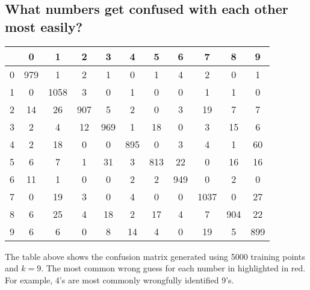 \documentclass{article}
\begin{document}
\subsection{What numbers get confused with each other most easily?}
{\scriptsize
\begin{tabular}{r|cccccccccc}
& 0 & 1 & 2 & 3 & 4 & 5 & 6 & 7 & 8 & 9 \\
\hline\noalign{\smallskip}
0 & 979 & 1 & 2 & 1 & 0 & 1 & \color{red}4 & 2 & 0 & 1 \\
1 & 0 & 1058 & \color{red}3 & 0 & 1 & 0 & 0 & 1 & 1 & 0 \\
2 &  14  & \color{red}26 & 907 & 5 & 2 & 0 & 3 & 19 & 7 & 7 \\
3 & 2 & 4 & 12 & 969 & 1 & \color{red}18 & 0 & 3 & 15 & 6 \\
4 & 2 & 18 & 0 & 0 & 895 & 0 & 3 & 4 & 1 & \color{red}60 \\
5 & 6 & 7 & 1 & \color{red}31 & 3 & 813 & 22 & 0 & 16 & 16 \\ 
6 & \color{red}11 & 1 & 0 & 0 & 2 & 2 & 949 & 0 & 2 & 0 \\ 
7 & 0 & 19 & 3 & 0 & 4 & 0 & 0 & 1037 & 0 & \color{red}27\\ 
8 & 6 & \color{red}25 & 4 & 18 & 2 & 17 & 4 & 7 & 904 & 22 \\
9 & 6 & 6 & 0 & 8 & 14 & 4 & 0 & \color{red}19 & 5 & 899 \\
\end{tabular}}

The table above shows the confusion matrix generated using 5000 training points and $k=9$. The most common wrong guess for each number in highlighted in red. For example, 4's are most commonly wrongfully identified 9's.
\end{document}
